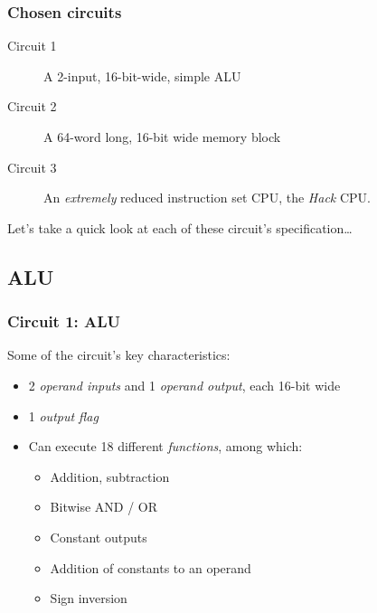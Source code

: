 \documentclass{beamer}
\begin{document}
            \begin{frame}
                \frametitle{Chosen circuits}

                \begin{description}
                    \item[Circuit 1] A 2-input, 16-bit-wide, simple ALU
                    \item[Circuit 2] A 64-word long, 16-bit wide memory block
                    \item[Circuit 3] An \emph{extremely} reduced instruction set CPU,
                        the \emph{Hack} CPU.
                \end{description}
                \vspace{0.05\textwidth}

                \par{Let's take a quick look at each of these circuit's specification\ldots}
            \end{frame}


        \subsection{ALU}
        \label{subsec:alu}
            \begin{frame}
                \frametitle{Circuit 1: ALU}

                \par{Some of the circuit's key characteristics:}

                \begin{itemize}
                    \item 2 \emph{operand inputs} and 1 \emph{operand output}, each 16-bit wide
                    \item 1 \emph{output flag}
                    \item Can execute 18 different \emph{functions}, among which:
                        \begin{itemize}
                            \item Addition, subtraction
                            \item Bitwise AND / OR
                            \item Constant outputs
                            \item Addition of constants to an operand
                            \item Sign inversion
                        \end{itemize}
                \end{itemize}
            \end{frame}
\end{document}
